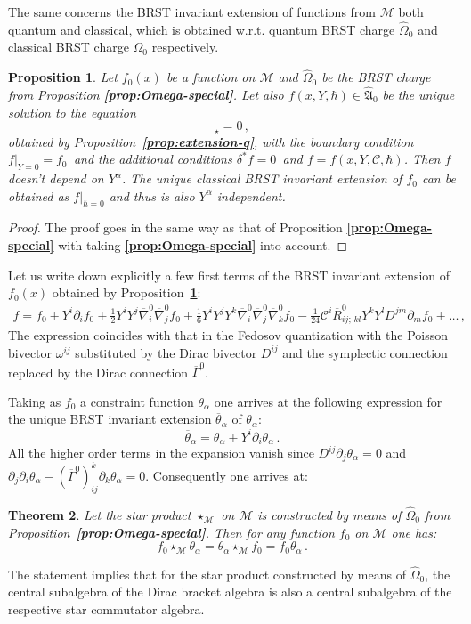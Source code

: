 \documentclass[a4paper,11pt]{amsart}
\newtheorem{thm}{Theorem}
\newtheorem{prop}[thm]{Proposition}
\numberwithin{thm}{section} %
\numberwithin{equation}{section} %
\numberwithin{figure}{section} %
\newcommand{\bref}[1]{{\bf \ref{#1}}}
\newcommand{\qcommut}[2]{[#1,#2]_\star}
\renewcommand{\:}{{\rm\, :\,}}
\def\bar{\overline}
\def\d{\partial}
\def\half{{\frac{1}{2}}}
\def\cc{{\mathcal C}}
\def\manM{{\mathcal M}}
\def\qA{{\hat{\mathfrak A}}}
\def\con{{\bar\Gamma}}
\def\diff-con{{\bar\nabla}}
\begin{document}
The same concerns the BRST invariant extension of functions from
$\manM$ both quantum and classical, which is obtained w.r.t. quantum
BRST charge ${\hat\Omega}_0$ and classical BRST charge $\Omega_0$
respectively.
\begin{prop}
\label{prop:extension-special}
Let $f_0(x)$ be a function on $\manM$ and ${\hat\Omega}_0$
be the BRST charge from Proposition \bref{prop:Omega-special}.
Let also $f(x,Y,\hbar)\in \qA_0$ be the unique solution to the
equation
\begin{equation}
  \qcommut{{\hat\Omega}_0}{f}=0\,,
\end{equation}
obtained by Proposition~\bref{prop:extension-q},
with the boundary condition $f{\bigr|}_{Y=0}=f_0\,$ and the additional
conditions $\delta^*f=0\,$ and $f=f(x,Y,\cc,\hbar)$.  Then $f$ doesn't depend
on $Y^\alpha$. The unique classical BRST invariant extension of $f_0$
can be obtained as $f|_{\hbar=0}$ and thus is also
$Y^\alpha$ independent.
\end{prop}
\begin{proof}
The proof goes in the same way as that of Proposition
\bref{prop:Omega-special} with taking \bref{prop:Omega-special}
into account.
\end{proof}

Let us write down explicitly a few first terms of the BRST invariant
extension of $f_0(x)$ obtained by
Proposition~\bref{prop:extension-special}:
\begin{multline}
  f=f_0+Y^i\d_if_0+\half Y^iY^j\diff-con^0_i \diff-con^0_j f_0
+\frac{1}{6}Y^i Y^j Y^k\diff-con^0_i \diff-con^0_j \diff-con^0_k f_0
-\frac{1}{24}\cc^i {\bar R}^0_{ij;\,kl}Y^kY^lD^{jm}\d_m f_0+
\ldots\,,
\end{multline}
The expression coincides with that in the Fedosov quantization with
the Poisson bivector $\omega^{ij}$ substituted by the Dirac bivector
$D^{ij}$ and the symplectic connection replaced by the Dirac connection
$\con^0$.

Taking as $f_0$ a constraint function $\theta_\alpha$ one arrives at
the following expression for the unique BRST invariant extension
${\bar\theta}_\alpha$ of $\theta_\alpha$:
\begin{equation}
  {\bar\theta}_{\alpha}=\theta_\alpha+Y^i\d_i\theta_\alpha\,.
\end{equation}
All the higher order terms in the expansion vanish
since $D^{ij}\d_j\theta_\alpha=0$ and
$\d_j\d_i\theta_\alpha-(\con^0)^k_{ij}\d_k\theta_\alpha=0$. 
Consequently one arrives at:
\begin{thm}
Let the star product $\star_\manM$ on $\manM$ is constructed by means of
${\hat\Omega}_0$ from Proposition~\bref{prop:Omega-special}. Then
for any function $f_0$ on $\manM$ one has:
\begin{equation}
f_0\star_\manM \theta_\alpha=
 \theta_\alpha \star_\manM f_0=
f_0\theta_\alpha\,.
\end{equation}
\end{thm}
The statement implies that for the star product
constructed by means of ${\hat\Omega}_0$, the central subalgebra
of the Dirac bracket algebra is also a central subalgebra
of the respective star commutator algebra.
\end{document}
